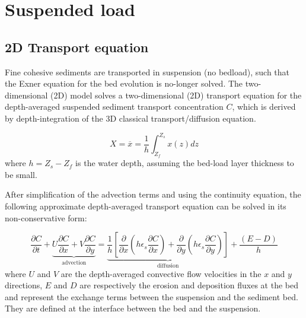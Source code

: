 \pagebreak
\section{Suspended load}




\subsection{2D Transport equation}
Fine cohesive sediments are transported in suspension (no bedload), such
that the Exner equation for the bed evolution is no-longer solved. The two-dimensional
(2D) model solves a two-dimensional (2D) transport equation for the
depth-averaged suspended sediment transport concentration $C$, which is
derived by depth-integration of the 3D classical transport/diffusion
equation.

\begin{equation*}
X=\overline{x} = \frac{1}{h} \int_{Z_f}^{Z_s} x(z) d z 
\end{equation*}
where $h = Z_s - Z_f$ is the water depth, assuming the bed-load layer
thickness to be small.

After simplification of the advection terms and using the continuity
equation, the following approximate depth-averaged transport equation can be
solved in its non-conservative form:

\begin{equation*}
\frac{\partial C}{\partial t} + 
\underbrace{U\frac{\partial C}{\partial x} + V\frac{\partial C}{\partial y}}_{\text{advection}} = 
\underbrace{\frac{1}{h}\left[\frac{\partial}{\partial x}\left(h\epsilon_s\frac{\partial C}{\partial x}\right) + 
\frac{\partial}{\partial y}\left(h\epsilon_s\frac{\partial C}{\partial y}\right) \right]}_{\text{diffusion}} + 
\frac{(E-D)}{h}
\end{equation*}
where $U$ and $V$ are the depth-averaged convective flow
velocities in the $x$ and $y$ directions, $E$ and $D$ are respectively the erosion and
deposition fluxes at the bed and represent the exchange terms between the
suspension and the sediment bed. They are defined at the interface between
the bed and the suspension.

